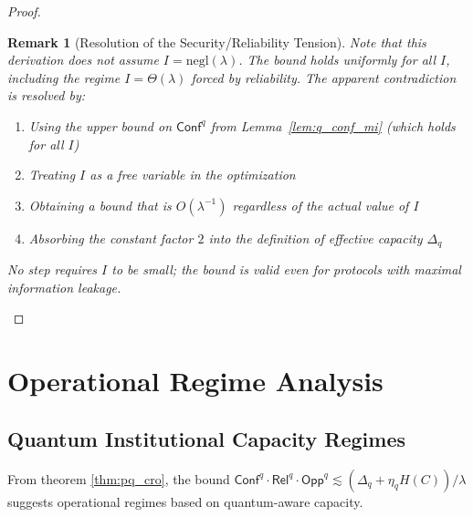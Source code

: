 \documentclass{ieeeaccess}
\newcommand{\Conf}{\mathsf{Conf}}
\newcommand{\Rel}{\mathsf{Rel}}
\newcommand{\Opp}{\mathsf{Opp}}
\newtheorem{remark}{Remark}[section]
\begin{document}
\begin{proof}
\begin{remark}[Resolution of the Security/Reliability Tension]
Note that this derivation does not assume $I = \mathrm{negl}(\lambda)$. The bound holds uniformly for all $I$, including the regime $I = \Theta(\lambda)$ forced by reliability. The apparent contradiction is resolved by:
\begin{enumerate}
    \item Using the \emph{upper bound} on $\Conf^q$ from Lemma~\ref{lem:q_conf_mi} (which holds for all $I$)
    \item Treating $I$ as a free variable in the optimization
    \item Obtaining a bound that is $O(\lambda^{-1})$ regardless of the actual value of $I$
    \item Absorbing the constant factor $2$ into the definition of effective capacity $\Delta_q$
\end{enumerate}
No step requires $I$ to be small; the bound is valid even for protocols with maximal information leakage.
\end{remark}
\end{proof}

\section{Operational Regime Analysis}\label{sec:regimes}

\subsection{Quantum Institutional Capacity Regimes}

From theorem \ref{thm:pq_cro}, the bound $\Conf^q \cdot \Rel^q \cdot \Opp^q \lesssim (\Delta_q + \eta_q H(C))/\lambda$ suggests operational regimes based on quantum-aware capacity.
\end{document}
